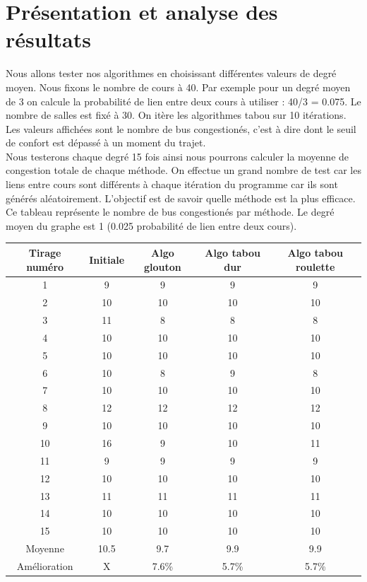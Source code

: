 \documentclass[a4paper,11pt]{article}
\begin{document}
\section{Présentation et analyse des résultats}
	Nous allons tester nos algorithmes en choisissant différentes valeurs de degré moyen. Nous fixons le nombre de cours à 40. Par exemple pour un degré moyen de 3 on calcule la probabilité de lien entre deux cours à utiliser : 40/3 = 0.075. Le nombre de salles est fixé à 30. On itère les algorithmes tabou sur 10 itérations. Les valeurs affichées sont le nombre de bus congestionés, c'est à dire dont le seuil de confort est dépassé à un moment du trajet.\\
	Nous testerons chaque degré 15 fois ainsi nous pourrons calculer la moyenne de congestion totale de chaque méthode. On effectue un grand nombre de test car les liens entre cours sont différents à chaque itération du programme car ils sont générés aléatoirement. L'objectif est de savoir quelle méthode est la plus efficace.
	\newpage
	Ce tableau représente le nombre de bus congestionés par méthode. Le degré moyen du graphe est 1 (0.025 probabilité de lien entre deux cours).\\ 
	\begin{tabular}{|c|c|c|c|c|}
  		\hline
  		Tirage numéro & Initiale & Algo glouton & Algo tabou dur & Algo tabou roulette\\
  		\hline
  		1 & 9 & 9 & 9 & 9\\
  		\hline
  		2 & 10 & 10 & 10 & 10\\
  		\hline
  		3 & 11 & 8 & 8 & 8\\
  		\hline
  		4 & 10 & 10 & 10 & 10\\
  		\hline
  		5 & 10 & 10 & 10 & 10\\
  		\hline
  		6 & 10 & 8 & 9 & 8\\
  		\hline
  		7 & 10 & 10 & 10 & 10\\
  		\hline
  		8 & 12 & 12 & 12 & 12\\
  		\hline
  		9 & 10 & 10 & 10 & 10\\
  		\hline
  		10 & 16 & 9 & 10 & 11\\
  		\hline
  		11 & 9 & 9 & 9 & 9\\
  		\hline
  		12 & 10 & 10 & 10 & 10\\
  		\hline
  		13 & 11 & 11 & 11 & 11\\
  		\hline
  		14 & 10 & 10 & 10 & 10\\
  		\hline
  		15 & 10 & 10 & 10 & 10\\
  		\hline
  		Moyenne & 10.5 & 9.7 & 9.9 & 9.9 \\
  		\hline
  		Amélioration & X & 7.6\% & 5.7\% & 5.7\%\\
  		\hline
	\end{tabular}
\end{document}
